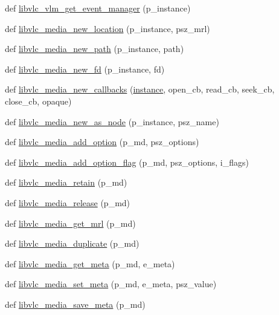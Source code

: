 \begin{DoxyCompactItemize}
\item 
def \hyperlink{namespacevlc_aeeafd7297de31ccc1034c0e37175715f}{libvlc\+\_\+vlm\+\_\+get\+\_\+event\+\_\+manager} (p\+\_\+instance)
\item 
def \hyperlink{namespacevlc_a19cace5a9aa822730b23b7b38f46de31}{libvlc\+\_\+media\+\_\+new\+\_\+location} (p\+\_\+instance, psz\+\_\+mrl)
\item 
def \hyperlink{namespacevlc_af8a94ee24b767ca229760d6630f20475}{libvlc\+\_\+media\+\_\+new\+\_\+path} (p\+\_\+instance, path)
\item 
def \hyperlink{namespacevlc_ab47a8f7f91485525472a13de0e66b7ff}{libvlc\+\_\+media\+\_\+new\+\_\+fd} (p\+\_\+instance, fd)
\item 
def \hyperlink{namespacevlc_a06f233cba42468c4eb2128bef3bd44c9}{libvlc\+\_\+media\+\_\+new\+\_\+callbacks} (\hyperlink{namespacevlc_a5ffaf17e178b3a6fa2012fe3050ede22}{instance}, open\+\_\+cb, read\+\_\+cb, seek\+\_\+cb, close\+\_\+cb, opaque)
\item 
def \hyperlink{namespacevlc_ac0fdd830232f9a278f6631b2cf3f32d9}{libvlc\+\_\+media\+\_\+new\+\_\+as\+\_\+node} (p\+\_\+instance, psz\+\_\+name)
\item 
def \hyperlink{namespacevlc_adbf254196790831139b165b8f20bab19}{libvlc\+\_\+media\+\_\+add\+\_\+option} (p\+\_\+md, psz\+\_\+options)
\item 
def \hyperlink{namespacevlc_a7dc1f3fd16f555dec3a3bf5466c86d5f}{libvlc\+\_\+media\+\_\+add\+\_\+option\+\_\+flag} (p\+\_\+md, psz\+\_\+options, i\+\_\+flags)
\item 
def \hyperlink{namespacevlc_a2b167bfab4fb7404a19959b120c74587}{libvlc\+\_\+media\+\_\+retain} (p\+\_\+md)
\item 
def \hyperlink{namespacevlc_ae668655a5e78df06ce22579586bb62bc}{libvlc\+\_\+media\+\_\+release} (p\+\_\+md)
\item 
def \hyperlink{namespacevlc_aafa8b7a81c78b84c54b79a80aa1fc63f}{libvlc\+\_\+media\+\_\+get\+\_\+mrl} (p\+\_\+md)
\item 
def \hyperlink{namespacevlc_a20f923172a3ea8b7f3c254e234336d7b}{libvlc\+\_\+media\+\_\+duplicate} (p\+\_\+md)
\item 
def \hyperlink{namespacevlc_a6c1e8a08c9abed8c2f421cd6a2036990}{libvlc\+\_\+media\+\_\+get\+\_\+meta} (p\+\_\+md, e\+\_\+meta)
\item 
def \hyperlink{namespacevlc_aaef688f523878755ccf5425b1c5ea3a1}{libvlc\+\_\+media\+\_\+set\+\_\+meta} (p\+\_\+md, e\+\_\+meta, psz\+\_\+value)
\item 
def \hyperlink{namespacevlc_ad95c7299c647fa68384b974e4561f9b4}{libvlc\+\_\+media\+\_\+save\+\_\+meta} (p\+\_\+md)

\end{DoxyCompactItemize}

